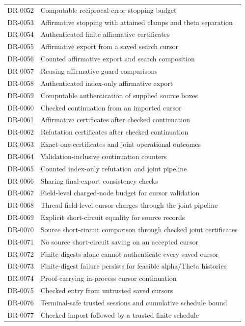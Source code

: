 \begin{longtable}{p{.14\linewidth}p{.79\linewidth}}
DR-0052 & Computable reciprocal-error stopping budget\\
DR-0053 & Affirmative stopping with attained clamps and theta separation\\
DR-0054 & Authenticated finite affirmative certificates\\
DR-0055 & Affirmative export from a saved search cursor\\
DR-0056 & Counted affirmative export and search composition\\
DR-0057 & Reusing affirmative guard comparisons\\
DR-0058 & Authenticated index-only affirmative export\\
DR-0059 & Computable authentication of supplied source boxes\\
DR-0060 & Checked continuation from an imported cursor\\
DR-0061 & Affirmative certificates after checked continuation\\
DR-0062 & Refutation certificates after checked continuation\\
DR-0063 & Exact-one certificates and joint operational outcomes\\
DR-0064 & Validation-inclusive continuation counters\\
DR-0065 & Counted index-only refutation and joint pipeline\\
DR-0066 & Sharing final-export consistency checks\\
DR-0067 & Field-level charged-node budget for cursor validation\\
DR-0068 & Thread field-level cursor charges through the joint pipeline\\
DR-0069 & Explicit short-circuit equality for source records\\
DR-0070 & Source short-circuit comparison through checked joint certificates\\
DR-0071 & No source short-circuit saving on an accepted cursor\\
DR-0072 & Finite digests alone cannot authenticate every saved cursor\\
DR-0073 & Finite-digest failure persists for feasible alpha/Theta histories\\
DR-0074 & Proof-carrying in-process cursor continuation\\
DR-0075 & Checked entry from untrusted saved cursors\\
DR-0076 & Terminal-safe trusted sessions and cumulative schedule bound\\
DR-0077 & Checked import followed by a trusted finite schedule\\

\end{longtable}
